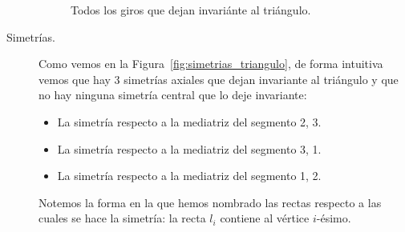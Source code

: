 \begin{ejemplo}
\begin{description}
\begin{figure}[H]
            \caption{Todos los giros que dejan invariánte al triángulo.}
            \label{fig:giros_triangulo}
            \end{figure}
        \item [Simetrías.] Como vemos en la Figura~\ref{fig:simetrias_triangulo}, de forma intuitiva vemos que hay 3 simetrías axiales que dejan invariante al triángulo y que no hay ninguna simetría central que lo deje invariante:
            \begin{itemize}
                \item La simetría respecto a la mediatriz del segmento 2, 3.
                \item La simetría respecto a la mediatriz del segmento 3, 1.
                \item La simetría respecto a la mediatriz del segmento 1, 2.
            \end{itemize}
            Notemos la forma en la que hemos nombrado las rectas respecto a las cuales se hace la simetría: la recta $l_i$ contiene al vértice $i$-ésimo.
            \begin{figure}[H]
                \centering
                \hspace{1cm}
\end{figure}
\end{description}
\end{ejemplo}
